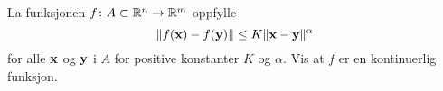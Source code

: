 

\oppgave[V2014, Oppgave 8] La funksjonen $f \colon A \subset \mathbb{R}^n \to \mathbb{R}^m$
oppfylle
%
\begin{equation*}
  \lVert f(\mathbf{x}) - f(\mathbf{y})\rVert \leq K \lVert\mathbf{x} - \mathbf{y}\rVert^\alpha
\end{equation*}
%
for alle $\mathbf{x}$ og $\mathbf{y}$ i $A$ for positive konstanter $K$ og $\alpha$. Vis at $f$
er en kontinuerlig funksjon.

